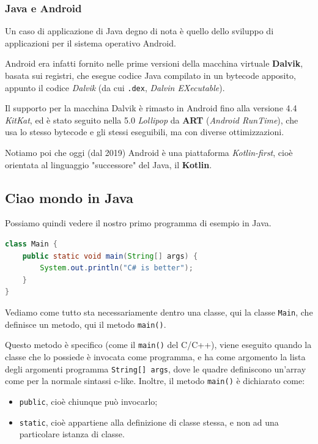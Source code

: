 \documentclass[a4paper,11pt]{article}
\begin{document}
\subsubsection{Java e Android}
Un caso di applicazione di Java degno di nota è quello dello sviluppo di applicazioni per il sistema operativo Android.

Android era infatti fornito nelle prime versioni della macchina virtuale \textbf{Dalvik}, basata sui registri, che esegue codice Java compilato in un bytecode apposito, appunto il codice \textit{Dalvik} (da cui \lstinline|.dex|, \textit{Dalvin EXecutable}).

Il supporto per la macchina Dalvik è rimasto in Android fino alla versione 4.4 \textit{KitKat}, ed è stato seguito nella 5.0 \textit{Lollipop} da \textbf{ART} (\textit{Android RunTime}), che usa lo stesso bytecode e gli stessi eseguibili, ma con diverse ottimizzazioni.

Notiamo poi che oggi (dal 2019) Android è una piattaforma \textit{Kotlin-first}, cioè orientata al linguaggio "successore" del Java, il \textbf{Kotlin}.

\subsection{Ciao mondo in Java}
Possiamo quindi vedere il nostro primo programma di esempio in Java.
\begin{lstlisting}[language=java, style=codestyle]	
class Main {
	public static void main(String[] args) {
		System.out.println("C# is better");
	}
}
\end{lstlisting}

Vediamo come tutto sta necessariamente dentro una classe, qui la classe \lstinline|Main|, che definisce un metodo, qui il metodo \lstinline|main()|.

Questo metodo è specifico (come il \lstinline|main()| del C/C++), viene eseguito quando la classe che lo possiede è invocata come programma, e ha come argomento la lista degli argomenti programma \lstinline|String[] args|, dove le quadre definiscono un'array come per la normale sintassi c-like.
Inoltre, il metodo \lstinline|main()| è dichiarato come:
\begin{itemize}
	\item \lstinline|public|, cioè chiunque può invocarlo;
	\item \lstinline|static|, cioè appartiene alla definizione di classe stessa, e non ad una particolare istanza di classe.
\end{itemize}
\end{document}
